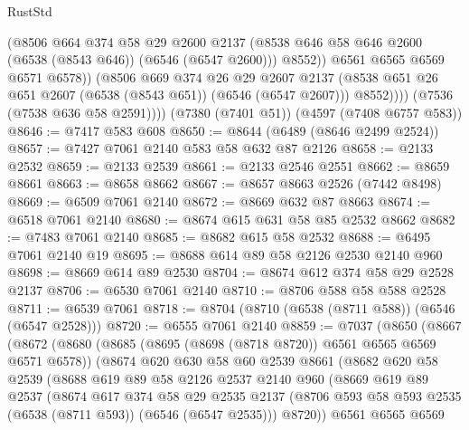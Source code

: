 \begin{lexlean}{RustStd}
\begin{coremodule}
                    (@8506
                      @664
                      @374
                      @58
                      @29
                      @2600
                      @2137
                      (@8538 @646 @58 @646 @2600 (@6538 (@8543 @646)) (@6546 (@6547 @2600)))
                      @8552))
                  @6561
                  @6565
                  @6569
                  @6571
                  @6578))
              (@8506
                @669
                @374
                @26
                @29
                @2607
                @2137
                (@8538 @651 @26 @651 @2607 (@6538 (@8543 @651)) (@6546 (@6547 @2607)))
                @8552))))
        (@7536 (@7538 @636 @58 @2591))))
    (@7380 (@7401 @51))
    (@4597 (@7408 @6757 @583))
@8646 := @7417 @583 @608
@8650 := @8644 (@6489 (@8646 @2499 @2524))
@8657 := @7427 @7061 @2140 @583 @58 @632 @87 @2126
@8658 := @2133 @2532
@8659 := @2133 @2539
@8661 := @2133 @2546 @2551
@8662 := @8659 @8661
@8663 := @8658 @8662
@8667 := @8657 @8663 @2526 (@7442 @8498)
@8669 := @6509 @7061 @2140
@8672 := @8669 @632 @87 @8663
@8674 := @6518 @7061 @2140
@8680 := @8674 @615 @631 @58 @85 @2532 @8662
@8682 := @7483 @7061 @2140
@8685 := @8682 @615 @58 @2532
@8688 := @6495 @7061 @2140 @19
@8695 := @8688 @614 @89 @58 @2126 @2530 @2140 @960
@8698 := @8669 @614 @89 @2530
@8704 := @8674 @612 @374 @58 @29 @2528 @2137
@8706 := @6530 @7061 @2140
@8710 := @8706 @588 @58 @588 @2528
@8711 := @6539 @7061
@8718 := @8704 (@8710 (@6538 (@8711 @588)) (@6546 (@6547 @2528)))
@8720 := @6555 @7061 @2140
@8859 := @7037
    (@8650
      (@8667
        (@8672
          (@8680
            (@8685 (@8695 (@8698 (@8718 @8720)) @6561 @6565 @6569 @6571 @6578))
            (@8674
              @620
              @630
              @58
              @60
              @2539
              @8661
              (@8682
                @620
                @58
                @2539
                (@8688
                  @619
                  @89
                  @58
                  @2126
                  @2537
                  @2140
                  @960
                  (@8669
                    @619
                    @89
                    @2537
                    (@8674
                      @617
                      @374
                      @58
                      @29
                      @2535
                      @2137
                      (@8706 @593 @58 @593 @2535 (@6538 (@8711 @593)) (@6546 (@6547 @2535)))
                      @8720))
                  @6561
                  @6565
                  @6569

\end{coremodule}
\end{lexlean}
